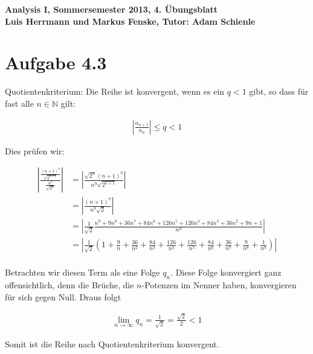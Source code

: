 \documentclass[a4paper,german,12pt,smallheadings]{scrartcl}
\begin{document}
\begin{center}
\bfseries %
\sffamily %
\vspace{-40pt}
Analysis I, Sommersemester 2013, 4. Übungsblatt \\
Luis Herrmann und Markus Fenske, Tutor: Adam Schienle
\vspace{-10pt}
\end{center}

\section*{Aufgabe 4.3}
Quotientenkriterium: Die Reihe ist konvergent, wenn es ein $q < 1$ gibt, so
dass für fast alle $n \in \mathbb{N}$ gilt:

\begin{align*}
  \left| \frac{a_{n+1}}{a_n} \right| \le q < 1
\end{align*}

Dies prüfen wir:

\begin{align*}
  \left| \frac{\frac{(n+1)^9}{\sqrt{2^{n+1}}}}{\frac{n^9}{\sqrt{2^n}}} \right| &= \left| \frac{\sqrt{2^n} (n+1)^9}{n^9 \sqrt{2^{n+1}}} \right| \\
  &= \left| \frac{(n+1)^9}{n^9 \sqrt{2}} \right| \\
  &= \left| \frac{1}{\sqrt{2}} \frac{n^9+9n^8+36n^7+84n^6+126n^5+126n^4+84n^3+36n^2+9n+1}{n^9} \right| \\
  &= \left| \frac{1}{\sqrt{2}} \left(1 + \frac{9}{n} + \frac{36}{n^2} + \frac{84}{n^3} + \frac{126}{n^4} + \frac{126}{n^5} + \frac{84}{n^6} + \frac{36}{n^7} + \frac{9}{n^8} + \frac{1}{n^9}\right) \right| \\
\end{align*}

Betrachten wir diesen Term als eine Folge $q_n$. Diese Folge konvergiert ganz
offensichtlich, denn die Brüche, die $n$-Potenzen im Nenner haben, konvergieren
für sich gegen Null. Draus folgt

\begin{align*}
  \lim_{n \to \infty} q_n = \frac{1}{\sqrt{2}} = \frac{\sqrt{2}}{2} < 1
\end{align*}

Somit ist die Reihe nach Quotientenkriterium konvergent.
\end{document}
